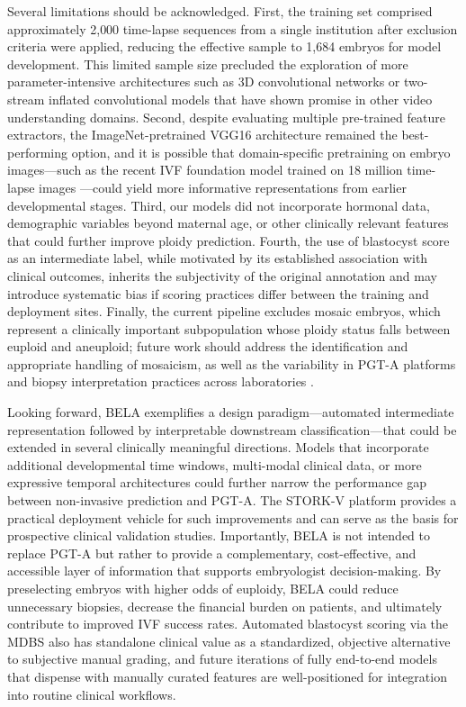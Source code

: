 \documentclass[11pt]{article}
\begin{document}
Several limitations should be acknowledged. First, the training set comprised approximately 2{,}000 time-lapse sequences from a single institution after exclusion criteria were applied, reducing the effective sample to 1{,}684 embryos for model development. This limited sample size precluded the exploration of more parameter-intensive architectures such as 3D convolutional networks or two-stream inflated convolutional models that have shown promise in other video understanding domains. Second, despite evaluating multiple pre-trained feature extractors, the ImageNet-pretrained VGG16 architecture remained the best-performing option, and it is possible that domain-specific pretraining on embryo images---such as the recent IVF foundation model trained on 18 million time-lapse images \citep{rajendran2025femi}---could yield more informative representations from earlier developmental stages. Third, our models did not incorporate hormonal data, demographic variables beyond maternal age, or other clinically relevant features that could further improve ploidy prediction. Fourth, the use of blastocyst score as an intermediate label, while motivated by its established association with clinical outcomes, inherits the subjectivity of the original annotation and may introduce systematic bias if scoring practices differ between the training and deployment sites. Finally, the current pipeline excludes mosaic embryos, which represent a clinically important subpopulation whose ploidy status falls between euploid and aneuploid; future work should address the identification and appropriate handling of mosaicism, as well as the variability in PGT-A platforms and biopsy interpretation practices across laboratories \citep{zou2022timelapse}.

Looking forward, BELA exemplifies a design paradigm---automated intermediate representation followed by interpretable downstream classification---that could be extended in several clinically meaningful directions. Models that incorporate additional developmental time windows, multi-modal clinical data, or more expressive temporal architectures could further narrow the performance gap between non-invasive prediction and PGT-A. The STORK-V platform provides a practical deployment vehicle for such improvements and can serve as the basis for prospective clinical validation studies. Importantly, BELA is not intended to replace PGT-A but rather to provide a complementary, cost-effective, and accessible layer of information that supports embryologist decision-making. By preselecting embryos with higher odds of euploidy, BELA could reduce unnecessary biopsies, decrease the financial burden on patients, and ultimately contribute to improved IVF success rates. Automated blastocyst scoring via the MDBS also has standalone clinical value as a standardized, objective alternative to subjective manual grading, and future iterations of fully end-to-end models that dispense with manually curated features are well-positioned for integration into routine clinical workflows.
\end{document}
